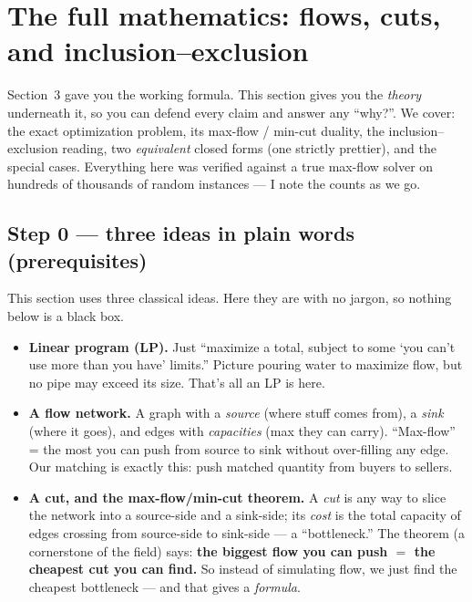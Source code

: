 \section{The full mathematics: flows, cuts, and inclusion--exclusion}

Section~3 gave you the working formula. This section gives you the \emph{theory}
underneath it, so you can defend every claim and answer any ``why?''. We cover:
the exact optimization problem, its max-flow / min-cut duality, the
inclusion--exclusion reading, two \emph{equivalent} closed forms (one strictly
prettier), and the special cases. Everything here was verified against a true
max-flow solver on hundreds of thousands of random instances --- I note the
counts as we go.

\subsection{Step 0 --- three ideas in plain words (prerequisites)}

This section uses three classical ideas. Here they are with no jargon, so nothing
below is a black box.

\begin{itemize}[leftmargin=1.5em]
  \item \textbf{Linear program (LP).} Just ``maximize a total, subject to some
        `you can't use more than you have' limits.'' Picture pouring water to
        maximize flow, but no pipe may exceed its size. That's all an LP is here.
  \item \textbf{A flow network.} A graph with a \emph{source} (where stuff comes
        from), a \emph{sink} (where it goes), and edges with \emph{capacities}
        (max they can carry). ``Max-flow'' = the most you can push from source to
        sink without over-filling any edge. Our matching is exactly this: push
        matched quantity from buyers to sellers.
  \item \textbf{A cut, and the max-flow/min-cut theorem.} A \emph{cut} is any way
        to slice the network into a source-side and a sink-side; its \emph{cost}
        is the total capacity of edges crossing from source-side to sink-side ---
        a ``bottleneck.'' The theorem (a cornerstone of the field) says: \textbf{the
        biggest flow you can push $=$ the cheapest cut you can find.} So instead of
        simulating flow, we just find the cheapest bottleneck --- and that gives a
        \emph{formula}.
\end{itemize}

